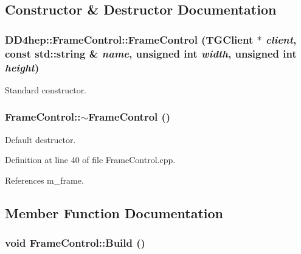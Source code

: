 \subsection{Constructor \& Destructor Documentation}
\hypertarget{class_d_d4hep_1_1_frame_control_aaecdd9166d4089a7e7892b88f4359126}{
\subsubsection[{FrameControl}]{\setlength{\rightskip}{0pt plus 5cm}DD4hep::FrameControl::FrameControl (TGClient $\ast$ {\em client}, \/  const std::string \& {\em name}, \/  unsigned int {\em width}, \/  unsigned int {\em height})}}
\label{class_d_d4hep_1_1_frame_control_aaecdd9166d4089a7e7892b88f4359126}


Standard constructor. \hypertarget{class_d_d4hep_1_1_frame_control_a84ff9b8462de97610195757d2cce4dd8}{
\subsubsection[{$\sim$FrameControl}]{\setlength{\rightskip}{0pt plus 5cm}FrameControl::$\sim$FrameControl ()}}
\label{class_d_d4hep_1_1_frame_control_a84ff9b8462de97610195757d2cce4dd8}


Default destructor. 

Definition at line 40 of file FrameControl.cpp.

References m\_\-frame.

\subsection{Member Function Documentation}
\hypertarget{class_d_d4hep_1_1_frame_control_a4ef181d24de565d17511bb9f5098184c}{
\subsubsection[{Build}]{\setlength{\rightskip}{0pt plus 5cm}void FrameControl::Build ()}}
\label{class_d_d4hep_1_1_frame_control_a4ef181d24de565d17511bb9f5098184c}


